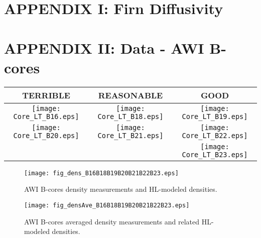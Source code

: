 \documentclass[../../CompleteThesis/Complete_1stDraft.tex]{subfiles}
\begin{document}
	\section[Appendix I]{APPENDIX I: Firn Diffusivity}
	\label{AppI:FirnDiffusivity}


	\newpage	
	\section[Appendix II]{APPENDIX II: Data - AWI B-cores}
	\label{AppII:Data_AWI}
	
	
	\newpage
	\begin{rotatepage}
		\begin{landscape}
			\begin{table}
				\centering
				\begin{tabular}{c||c||c}
					\textcolor{BrickRed}{\textbf{TERRIBLE}} & \textcolor{YellowOrange}{\textbf{REASONABLE}} & \textcolor{OliveGreen}{\textbf{GOOD}} \\
					\hline
					\texttt{[image: Core\_LT\_B16.eps]} & \texttt{[image: Core\_LT\_B18.eps]} & \texttt{[image: Core\_LT\_B19.eps]} \\
					\texttt{[image: Core\_LT\_B20.eps]} & \texttt{[image: Core\_LT\_B21.eps]} & \texttt{[image: Core\_LT\_B22.eps]} \\	
					& & \texttt{[image: Core\_LT\_B23.eps]} \\
				\end{tabular}
			\end{table}
		\end{landscape}
	\end{rotatepage}
	\newpage
	
	\begin{rotatepage}
		\begin{landscape}
			\begin{figure}[h]
				\centering
				\texttt{[image: fig\_dens\_B16B18B19B20B21B22B23.eps]}
				\label{fig:dens}
				\caption{AWI B-cores density measurements and HL-modeled densities.}
			\end{figure}
		\end{landscape}
	\end{rotatepage}
	\newpage
	\begin{rotatepage}
		\begin{landscape}
			\begin{figure}[h]
				\centering
				\texttt{[image: fig\_densAve\_B16B18B19B20B21B22B23.eps]}
				\label{fig:densAve}
				\caption{AWI B-cores averaged density measurements and related HL-modeled densities.}
			\end{figure}
		\end{landscape}
	\end{rotatepage}
	
\end{document}
